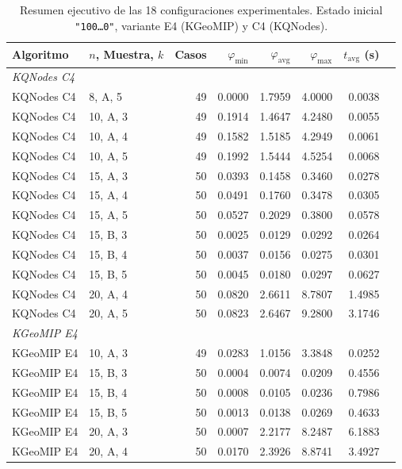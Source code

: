 {\small
\begin{table}[H]
\centering
\begin{tabular}{llrrrrrr}
  \toprule
  \textbf{Algoritmo} & $n$, Muestra, $k$ & \textbf{Casos} &
  $\varphi_{\min}$ & $\varphi_{\mathrm{avg}}$ & $\varphi_{\max}$ &
  $t_{\mathrm{avg}}$ (s) \\
  \midrule
  \multicolumn{7}{l}{\textit{KQNodes C4}} \\
  \midrule
  KQNodes C4 &  8, A, 5 & 49 & 0.0000 & 1.7959 & 4.0000 & 0.0038 \\
  KQNodes C4 & 10, A, 3 & 49 & 0.1914 & 1.4647 & 4.2480 & 0.0055 \\
  KQNodes C4 & 10, A, 4 & 49 & 0.1582 & 1.5185 & 4.2949 & 0.0061 \\
  KQNodes C4 & 10, A, 5 & 49 & 0.1992 & 1.5444 & 4.5254 & 0.0068 \\
  KQNodes C4 & 15, A, 3 & 50 & 0.0393 & 0.1458 & 0.3460 & 0.0278 \\
  KQNodes C4 & 15, A, 4 & 50 & 0.0491 & 0.1760 & 0.3478 & 0.0305 \\
  KQNodes C4 & 15, A, 5 & 50 & 0.0527 & 0.2029 & 0.3800 & 0.0578 \\
  KQNodes C4 & 15, B, 3 & 50 & 0.0025 & 0.0129 & 0.0292 & 0.0264 \\
  KQNodes C4 & 15, B, 4 & 50 & 0.0037 & 0.0156 & 0.0275 & 0.0301 \\
  KQNodes C4 & 15, B, 5 & 50 & 0.0045 & 0.0180 & 0.0297 & 0.0627 \\
  KQNodes C4 & 20, A, 4 & 50 & 0.0820 & 2.6611 & 8.7807 & 1.4985 \\
  KQNodes C4 & 20, A, 5 & 50 & 0.0823 & 2.6467 & 9.2800 & 3.1746 \\
  \midrule
  \multicolumn{7}{l}{\textit{KGeoMIP E4}} \\
  \midrule
  KGeoMIP E4 & 10, A, 3 & 49 & 0.0283 & 1.0156 & 3.3848 & 0.0252 \\
  KGeoMIP E4 & 15, B, 3 & 50 & 0.0004 & 0.0074 & 0.0209 & 0.4556 \\
  KGeoMIP E4 & 15, B, 4 & 50 & 0.0008 & 0.0105 & 0.0236 & 0.7986 \\
  KGeoMIP E4 & 15, B, 5 & 50 & 0.0013 & 0.0138 & 0.0269 & 0.4633 \\
  KGeoMIP E4 & 20, A, 3 & 50 & 0.0007 & 2.2177 & 8.2487 & 6.1883 \\
  KGeoMIP E4 & 20, A, 4 & 50 & 0.0170 & 2.3926 & 8.8741 & 3.4927 \\
  \bottomrule
\end{tabular}
\caption{Resumen ejecutivo de las 18 configuraciones experimentales.
  Estado inicial \texttt{"100\ldots0"}, variante E4 (KGeoMIP) y C4 (KQNodes).}
\label{tab:resumen_resultados}
\end{table}
}

